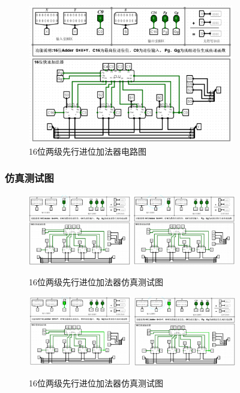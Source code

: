 \documentclass{article}
\begin{document}
    \begin{figure}[H]
    \centering
    \includegraphics[width=0.8\textwidth]{3.4.2.png}
    \caption{16位两级先行进位加法器电路图}
    \end{figure}

    \subsubsection{仿真测试图}
    \begin{figure}[H]
    \centering
    \includegraphics[width=0.4\textwidth]{3.5.1.png}
    \includegraphics[width=0.4\textwidth]{3.5.2.png}
    \caption{16位两级先行进位加法器仿真测试图}
    \end{figure}

    \begin{figure}[H]
    \centering
    \includegraphics[width=0.4\textwidth]{3.5.3.png}
    \includegraphics[width=0.4\textwidth]{3.5.4.png}
    \caption{16位两级先行进位加法器仿真测试图}
    \end{figure}
\end{document}
